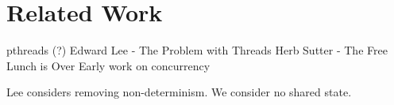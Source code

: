 \section{Related Work\label{related_work}}

pthreads (?)
Edward Lee - The Problem with Threads
Herb Sutter - The Free Lunch is Over
Early work on concurrency

Lee considers removing non-determinism.  We consider no shared state.
